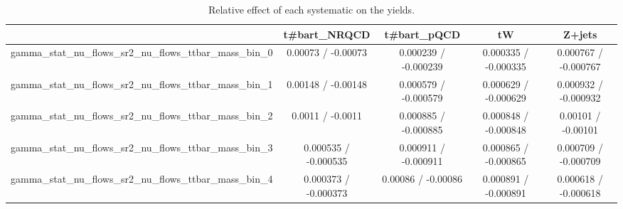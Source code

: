 \documentclass[10pt]{article}
\begin{document}
\begin{table}[htbp]
\begin{center}
\begin{tabular}{|c|c|c|c|c|}
\hline 
      & t#bar{t}_{NRQCD}      & t#bar{t}_{pQCD}      & tW      & Z+jets \\ 
\hline 
  gamma_stat_nu_flows_sr2_nu_flows_ttbar_mass_bin_0 & 0.00073 / -0.00073 & 0.000239 / -0.000239 & 0.000335 / -0.000335 & 0.000767 / -0.000767 \\ 
  gamma_stat_nu_flows_sr2_nu_flows_ttbar_mass_bin_1 & 0.00148 / -0.00148 & 0.000579 / -0.000579 & 0.000629 / -0.000629 & 0.000932 / -0.000932 \\ 
  gamma_stat_nu_flows_sr2_nu_flows_ttbar_mass_bin_2 & 0.0011 / -0.0011 & 0.000885 / -0.000885 & 0.000848 / -0.000848 & 0.00101 / -0.00101 \\ 
  gamma_stat_nu_flows_sr2_nu_flows_ttbar_mass_bin_3 & 0.000535 / -0.000535 & 0.000911 / -0.000911 & 0.000865 / -0.000865 & 0.000709 / -0.000709 \\ 
  gamma_stat_nu_flows_sr2_nu_flows_ttbar_mass_bin_4 & 0.000373 / -0.000373 & 0.00086 / -0.00086 & 0.000891 / -0.000891 & 0.000618 / -0.000618 \\ 
\hline 
\end{tabular} 
\caption{Relative effect of each systematic on the yields.} 
\end{center} 
\end{table} 
\end{document}
